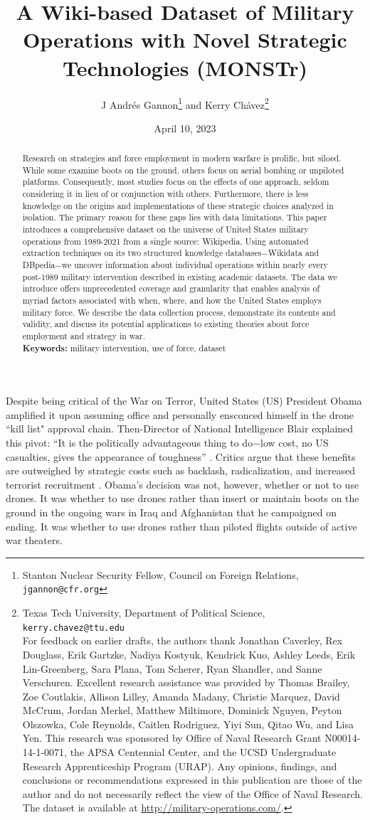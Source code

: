\documentclass[fleqn,12pt]{article}
\title{\singlespacing A Wiki-based Dataset of Military Operations with Novel Strategic Technologies (MONSTr)}
\author{J Andr\'{e}s Gannon{\thanks{Stanton Nuclear Security Fellow, Council on Foreign Relations, \texttt{jgannon@cfr.org}} } and Kerry Ch\'{a}vez{\thanks{Texas Tech University, Department of Political Science, \texttt{kerry.chavez@ttu.edu} \\
For feedback on earlier drafts, the authors thank Jonathan Caverley, Rex Douglass, Erik Gartzke, Nadiya Kostyuk, Kendrick Kuo, Ashley Leeds, Erik Lin-Greenberg, Sara Plana, Tom Scherer, Ryan Shandler, and Sanne Verschuren. Excellent research assistance was provided by Thomas Brailey, Zoe Coutlakis, Allison Lilley, Amanda Madany, Christie Marquez, David McCrum, Jordan Merkel, Matthew Miltimore, Dominick Nguyen, Peyton Olszowka, Cole Reynolds, Caitlen Rodriguez, Yiyi Sun, Qitao Wu, and Lisa Yen. This research was sponsored by Office of Naval Research Grant N00014-14-1-0071, the APSA Centennial Center, and the UCSD Undergraduate Research Apprenticeship Program (URAP). Any opinions, findings, and conclusions or recommendations expressed in this publication are those of the author and do not necessarily reflect the view of the Office of Naval Research. The dataset is available at \href{http://military-operations.com/}{http://military-operations.com/}.}}}
\date{April 10, 2023}
\begin{document}
	\maketitle
	\thispagestyle{empty}
	\setcounter{page}{0}
	\vspace{-0.4in}
	\begin{abstract}
            \singlespacing \noindent Research on strategies and force employment in modern warfare is prolific, but siloed. While some examine boots on the ground, others focus on aerial bombing or unpiloted platforms. Consequently, most studies focus on the effects of one approach, seldom considering it in lieu of or conjunction with others. Furthermore, there is less knowledge on the origins and implementations of these strategic choices analyzed in isolation. The primary reason for these gaps lies with data limitations. This paper introduces a comprehensive dataset on the universe of United States military operations from 1989-2021 from a single source: Wikipedia. Using automated extraction techniques on its two structured knowledge databases$-$Wikidata and DBpedia$-$we uncover information about individual operations within nearly every post-1989 military intervention described in existing academic datasets. The data we introduce offers unprecedented coverage and granularity that enables analysis of myriad factors associated with when, where, and how the United States employs military force. We describe the data collection process, demonstrate its contents and validity, and discuss its potential applications to existing theories about force employment and strategy in war. \\ \vspace{.1in}
	\noindent
	\textbf{Keywords:} military intervention, use of force, dataset
	\end{abstract}
	
\newpage
\noindent

Despite being critical of the War on Terror, United States (US) President Obama amplified it upon assuming office and personally ensconced himself in the drone ``kill list" approval chain. Then-Director of National Intelligence Blair explained this pivot: ``It is the politically advantageous thing to do$-$low cost, no US casualties, gives the appearance of toughness” \citep{becker_secretkilllist_2012}. Critics argue that these benefits are outweighed by strategic costs such as backlash, radicalization, and increased terrorist recruitment \citep{kilcullen_opiniondeathoutrage_2009}. Obama's decision was not, however, whether or not to use drones. It was whether to use drones rather than insert or maintain boots on the ground in the ongoing wars in Iraq and Afghanistan that he campaigned on ending. It was whether to use drones rather than piloted flights outside of active war theaters.
	
\end{document}
